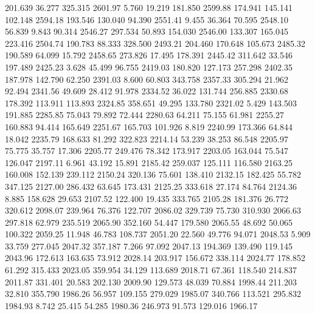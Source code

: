  201.639   36.277  325.315      2601.97
   5.760   19.219  181.850      2599.88
 174.941  145.141  102.148      2594.18
 193.546  130.040   94.390      2551.41
   9.455   36.364   70.595      2548.10
  56.839    9.843   90.314      2546.27
 297.534   50.893  154.030      2546.00
 133.307  165.045  223.416      2504.74
 190.783   88.333  328.500      2493.21
 204.460  170.648  105.673      2485.32
 190.589   64.099   15.792      2458.65
 273.826   17.495  178.391      2445.42
 311.642   33.546  197.489      2425.23
   3.628   45.499   96.755      2419.03
 180.820  127.173  257.298      2402.35
 187.978  142.790   62.250      2391.03
   8.600   60.803  343.758      2357.33
 305.294   21.962   92.494      2341.56
  49.609   28.412   91.978      2334.52
  36.022  131.744  256.885      2330.68
 178.392  113.911  113.893      2324.85
 358.651   49.295  133.780      2321.02
   5.429  143.503  191.885      2285.85
  75.043   79.892   72.444      2280.63
  64.211   75.155   61.981      2255.27
 160.883   94.414  165.649      2251.67
 165.703  101.926    8.819      2240.99
 173.366   64.844   18.042      2235.79
 168.633   81.292  322.823      2214.14
  53.239   38.253   86.548      2205.97
  75.775   35.757   17.306      2205.77
 249.476   78.342  173.917      2203.05
 163.044   75.547  126.047      2197.11
   6.961   43.192   15.891      2185.42
 259.037  125.111  116.580      2163.25
 160.008  152.139  239.112      2150.24
 320.136   75.601  138.410      2132.15
 182.425   55.782  347.125      2127.00
 286.432   63.645  173.431      2125.25
 333.618   27.174   84.764      2124.36
   8.885  158.628   29.653      2107.52
 122.400   19.435  333.765      2105.28
 181.376   26.772  320.612      2098.07
 239.964   76.376  122.707      2086.02
 329.739   75.730  310.930      2066.63
 297.818   62.979  235.519      2065.90
 352.160   54.447  179.580      2065.55
  48.692   50.065  100.322      2059.25
  11.948   46.783  108.737      2051.20
  22.560   49.776   94.071      2048.53
   5.909   33.759  277.045      2047.32
 357.187    7.266   97.092      2047.13
 194.369  139.490  119.145      2043.96
 172.613  163.635   73.912      2028.14
 203.917  156.672  338.114      2024.77
 178.852   61.292  315.433      2023.05
 359.954   34.129  113.689      2018.71
  67.361  118.540  214.837      2011.87
 331.401   20.583  202.130      2009.90
 129.573   48.039   70.884      1998.44
 211.203   32.810  355.790      1986.26
  56.957  109.155  279.029      1985.07
 340.766  113.521  295.832      1984.93
   8.742   25.415   54.285      1980.36
 246.973   91.573  129.016      1966.17
